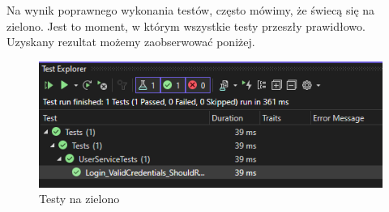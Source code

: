 \documentclass[a4paper,twoside,12pt]{book}
\begin{document}
Na wynik poprawnego wykonania testów, często mówimy, że świecą się na zielono. Jest to moment, w którym wszystkie testy przeszły prawidłowo. Uzyskany rezultat możemy zaobserwować poniżej.
\begin{figure}[H]
    \centering
    \includegraphics[width=1\textwidth]{poprawneTesty.png}
    \caption{Testy na zielono}
    \label{SuccessTests}
\end{figure}














\backmatter

\printbibliography           %
\end{document}
